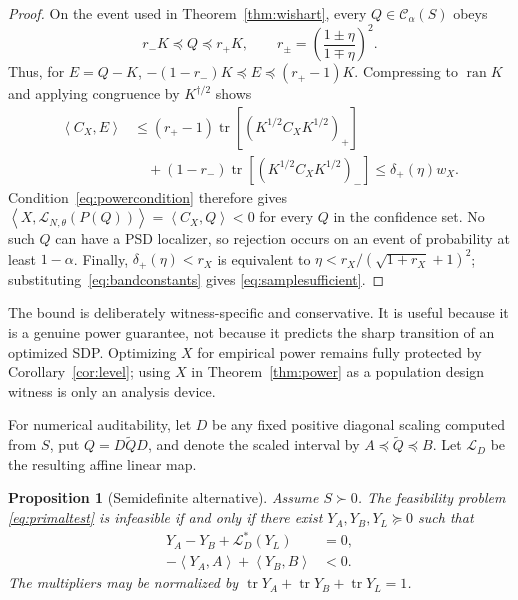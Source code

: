 \documentclass[11pt]{article}
\newtheorem{proposition}[theorem]{Proposition}
\newcommand{\tr}{\operatorname{tr}}
\newcommand{\ip}[2]{\left\langle #1,#2\right\rangle}
\begin{document}
\begin{proof}
On the event used in Theorem~\ref{thm:wishart}, every
$Q\in\mathcal C_\alpha(S)$ obeys
\[
 r_-K\preceq Q\preceq r_+K,
 \qquad
 r_\pm=\left(\frac{1\pm\eta}{1\mp\eta}\right)^2.
\]
Thus, for $E=Q-K$,
$-(1-r_-)K\preceq E\preceq(r_+-1)K$.  Compressing to
$\operatorname{ran}K$ and applying congruence by $K^{\dagger/2}$ shows
\begin{align}
 \ip{C_X}{E}
 &\le (r_+-1)\tr[(K^{1/2}C_XK^{1/2})_+]\\
 &\quad +(1-r_-)\tr[(K^{1/2}C_XK^{1/2})_-]
 \le\delta_+(\eta)w_X.
\end{align}
Condition~\eqref{eq:powercondition} therefore gives
$\ip{X}{\mathcal L_{N,\theta}(P(Q))}=\ip{C_X}{Q}<0$ for every $Q$ in the
confidence set.  No such $Q$ can have a PSD localizer, so rejection occurs on
an event of probability at least $1-\alpha$.  Finally,
$\delta_+(\eta)<r_X$ is equivalent to
$\eta<r_X/(\sqrt{1+r_X}+1)^2$; substituting~\eqref{eq:bandconstants} gives
\eqref{eq:samplesufficient}.
\end{proof}

The bound is deliberately witness-specific and conservative.  It is useful
because it is a genuine power guarantee, not because it predicts the sharp
transition of an optimized SDP.  Optimizing $X$ for empirical power remains
fully protected by Corollary~\ref{cor:level}; using $X$ in
Theorem~\ref{thm:power} as a population design witness is only an analysis
device.

For numerical auditability, let $D$ be any fixed positive diagonal scaling
computed from $S$, put $Q=D\widetilde QD$, and denote the scaled interval by
$A\preceq\widetilde Q\preceq B$.  Let $\mathcal L_D$ be the resulting affine
linear map.

\begin{proposition}[Semidefinite alternative]
\label{prop:dual}
Assume $S\succ0$.  The feasibility problem \eqref{eq:primaltest} is infeasible
if and only if there exist $Y_A,Y_B,Y_L\succeq0$ such that
\begin{align}
 Y_A-Y_B+\mathcal L_D^*(Y_L)&=0,\label{eq:stationarity}\\
 -\ip{Y_A}{A}+\ip{Y_B}{B}&<0.\label{eq:dualmargin}
\end{align}
The multipliers may be normalized by
$\tr Y_A+\tr Y_B+\tr Y_L=1$.
\end{proposition}
\end{document}
